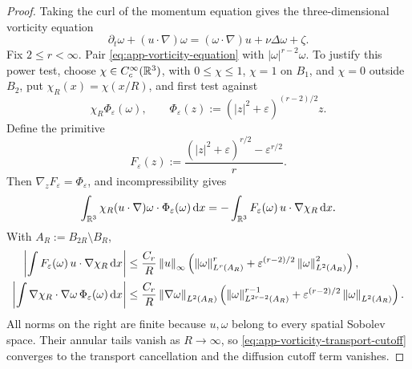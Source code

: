 \begin{proof}
Taking the curl of the momentum equation gives the three-dimensional
vorticity equation
\begin{equation}
 \partial_t\omega+(u\cdot\nabla)\omega
 = (\omega\cdot\nabla)u+\nu\Delta\omega+\zeta.
 \label{eq:app-vorticity-equation}
\end{equation}
Fix \(2\le r<\infty\).  Pair
\eqref{eq:app-vorticity-equation} with
\(|\omega|^{r-2}\omega\).  To justify this power test, choose
\(\chi\in C_c^\infty(\mathbb R^3)\), with
\(0\le\chi\le1\), \(\chi=1\) on \(B_1\), and \(\chi=0\) outside
\(B_2\), put \(\chi_R(x)=\chi(x/R)\), and first test against
\[
 \chi_R\Phi_\varepsilon(\omega),
 \qquad
 \Phi_\varepsilon(z):=(|z|^2+\varepsilon)^{(r-2)/2}z.
\]
Define the primitive
\begin{equation}
 F_\varepsilon(z)
 :=\frac{(|z|^2+\varepsilon)^{r/2}-\varepsilon^{r/2}}{r}.
 \label{eq:app-vorticity-regularized-primitive}
\end{equation}
Then \(\nabla_zF_\varepsilon=\Phi_\varepsilon\), and incompressibility gives
\begin{equation}
 \int_{\mathbb R^3}\chi_R(u\cdot\nabla)\omega\cdot
 \Phi_\varepsilon(\omega)\,\mathrm d x
 =-\int_{\mathbb R^3}F_\varepsilon(\omega)\,
 u\cdot\nabla\chi_R\,\mathrm d x.
 \label{eq:app-vorticity-transport-cutoff}
\end{equation}
With \(A_R:=B_{2R}\setminus B_R\),
\begin{align}
 \left|\int F_\varepsilon(\omega)\,
 u\cdot\nabla\chi_R\,\mathrm d x\right|
 &\le\frac{C_r}{R}\left\lVert u\right\rVert_\infty
 \left(\left\lVert \omega\right\rVert_{L^r(A_R)}^r
 +\varepsilon^{(r-2)/2}\left\lVert \omega\right\rVert_{L^2(A_R)}^2\right),
 \label{eq:app-vorticity-transport-cutoff-bound}\\
 \left|\int \nabla\chi_R\cdot\nabla\omega\,
 \Phi_\varepsilon(\omega)\,\mathrm d x\right|
 &\le\frac{C_r}{R}\left\lVert \nabla\omega\right\rVert_{L^2(A_R)}
 \left(\left\lVert \omega\right\rVert_{L^{2r-2}(A_R)}^{r-1}
 +\varepsilon^{(r-2)/2}\left\lVert \omega\right\rVert_{L^2(A_R)}\right).
 \label{eq:app-vorticity-diffusion-cutoff-bound}
\end{align}
All norms on the right are finite because \(u,\omega\) belong to every
spatial Sobolev space.  Their annular tails vanish as \(R\to\infty\), so
\eqref{eq:app-vorticity-transport-cutoff} converges to the transport
cancellation and the diffusion cutoff term vanishes.


\end{proof}
